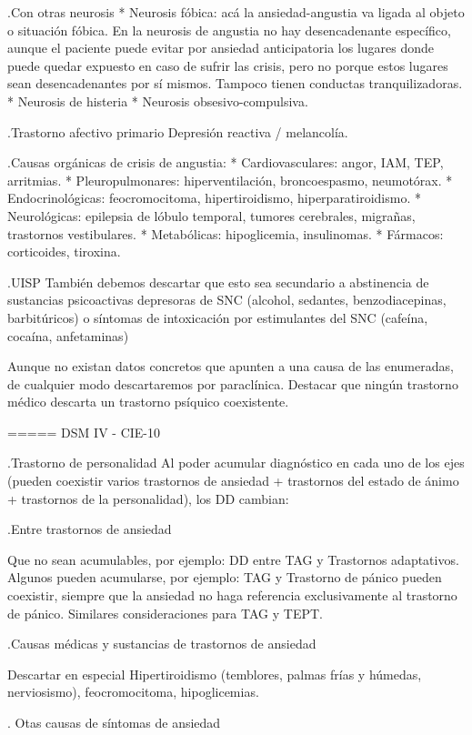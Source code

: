 \documentclass{scrbook}
\begin{document}
.Con otras neurosis
* Neurosis fóbica: acá la ansiedad-angustia va ligada al objeto o situación fóbica. En la neurosis de angustia no hay desencadenante específico, aunque el paciente puede evitar por ansiedad anticipatoria los lugares donde puede quedar expuesto en caso de sufrir las crisis, pero no porque estos lugares sean desencadenantes por sí mismos. Tampoco tienen conductas tranquilizadoras.
* Neurosis de histeria
* Neurosis obsesivo-compulsiva.

.Trastorno afectivo primario
Depresión reactiva / melancolía.

.Causas orgánicas de crisis de angustia:
* Cardiovasculares: angor, IAM, TEP, arritmias.
* Pleuropulmonares: hiperventilación, broncoespasmo, neumotórax.
* Endocrinológicas: feocromocitoma, hipertiroidismo, hiperparatiroidismo.
* Neurológicas: epilepsia de lóbulo temporal, tumores cerebrales, migrañas, trastornos vestibulares.
* Metabólicas: hipoglicemia, insulinomas.
* Fármacos: corticoides, tiroxina.

.UISP
También debemos descartar que esto sea secundario a abstinencia de sustancias psicoactivas depresoras de SNC (alcohol, sedantes, benzodiacepinas, barbitúricos) o síntomas de intoxicación por estimulantes del SNC (cafeína, cocaína, anfetaminas)

Aunque no existan datos concretos que apunten a una causa de las enumeradas, de cualquier modo descartaremos por paraclínica. Destacar que ningún trastorno médico descarta un trastorno psíquico coexistente.

===== DSM IV - CIE-10

.Trastorno de personalidad
Al poder acumular diagnóstico en cada uno de los ejes (pueden coexistir varios trastornos de ansiedad + trastornos del estado de ánimo + trastornos de la personalidad), los DD cambian:

.Entre trastornos de ansiedad

Que no sean acumulables, por ejemplo: DD entre TAG y Trastornos adaptativos. Algunos pueden acumularse, por ejemplo: TAG y Trastorno de pánico pueden coexistir, siempre que la ansiedad no haga referencia exclusivamente al trastorno de pánico. Similares consideraciones para TAG y TEPT.

.Causas médicas y sustancias de trastornos de ansiedad

Descartar en especial Hipertiroidismo (temblores, palmas frías y húmedas, nerviosismo), feocromocitoma, hipoglicemias.

. Otas causas de síntomas de ansiedad
\end{document}
